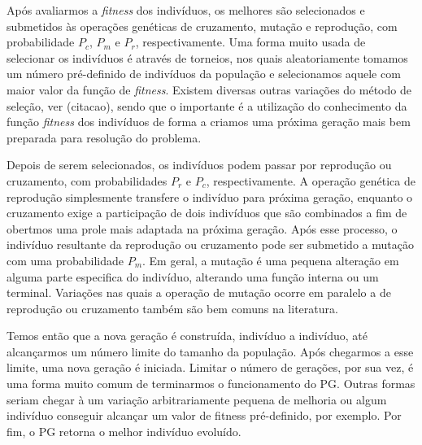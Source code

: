 Após avaliarmos a \textit{fitness} dos indivíduos, os melhores são selecionados e submetidos às operações genéticas de cruzamento, mutação e reprodução, com probabilidade $P_c$, $P_m$ e $P_r$, respectivamente.
Uma forma muito usada de selecionar os indivíduos é através de torneios, nos quais aleatoriamente tomamos um número pré-definido de indivíduos da população e selecionamos aquele com maior valor da função de \textit{fitness}. Existem diversas outras variações do método de seleção, ver (citacao), sendo que o importante é a utilização do conhecimento da função \textit{fitness} dos indivíduos de forma a criamos uma próxima geração mais bem preparada para resolução do problema. 

Depois de serem selecionados, os indivíduos podem passar por reprodução ou cruzamento, com probabilidades $P_r$ e $P_c$, respectivamente. 
A operação genética de reprodução simplesmente transfere o indivíduo para próxima geração, enquanto o cruzamento exige a participação de dois indivíduos que são combinados a fim de obertmos
uma prole mais adaptada na próxima geração.
Após esse processo, o indivíduo resultante da reprodução ou cruzamento pode ser submetido a mutação com uma probabilidade $P_m$.
Em geral, a mutação é uma pequena alteração em alguma parte especifica do indivíduo, alterando uma função interna ou um terminal.
Variações nas quais a operação de mutação ocorre em paralelo a de reprodução ou cruzamento também são bem comuns na literatura.

Temos então que a nova geração é construída, indivíduo a indivíduo, até alcançarmos um número limite do tamanho da população. Após chegarmos a esse limite, uma nova geração é iniciada. Limitar o número de gerações, por sua vez, é uma forma muito comum de terminarmos o funcionamento do \textsc{PG}. Outras formas seriam chegar à um variação arbitrariamente pequena de melhoria ou algum indivíduo conseguir alcançar um valor de fitness pré-definido, por exemplo. Por fim, o \textsc{PG} retorna o melhor indivíduo evoluído.


